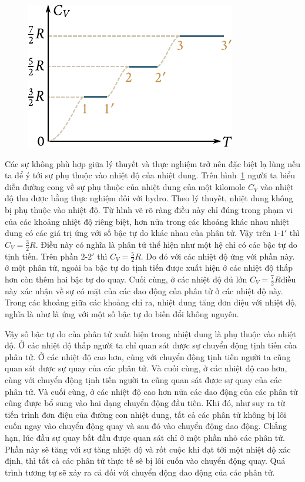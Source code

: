 \begin{figure}[!htb]
	\begin{center}
		\includegraphics[scale=1.0]{figures/ch_11/fig_11_13.pdf}
		\caption[]{}
		\label{fig:11_13}
	\end{center}
	\vspace{-0.8cm}
\end{figure}

Các sự không phù hợp giữa lý thuyết và thực nghiệm trở nên đặc biệt lạ lùng nếu ta để ý tới sự phụ thuộc vào nhiệt độ của nhiệt dung. Trên hình~\ref{fig:11_13} người ta biểu diễn đường cong về sự phụ thuộc của nhiệt dung của một kilomole $C_V$ vào nhiệt độ thu được bằng thực nghiệm đối với hydro. Theo lý thuyết, nhiệt dung không bị phụ thuộc vào nhiệt độ. Từ hình vẽ rõ ràng điều này chỉ đúng trong phạm vi của các khoảng nhiệt độ riêng biệt, hơn nữa trong các khoảng khác nhau nhiệt dung có các giá trị ứng với số bậc tự do khác nhau của phân tử. Vậy trên $1$-$1'$ thì $C_V=\frac{3}{2}R$. Điều này có nghĩa là phân tử thể hiện như một hệ chỉ có các bậc tự do tịnh tiến. Trên phần $2$-$2'$ thì $C_V=\frac{5}{2}R$. Do đó với các nhiệt độ ứng với phần này. ở một phân tử, ngoài ba bậc tự do tịnh tiến được xuất hiện ở các nhiệt độ thấp hơn còn thêm hai bậc tự do quay. Cuối cùng, ở các nhiệt độ đủ lớn $C_V=\frac{7}{2}R$điều này xác nhận về sự có mặt của các dao động của phân tử ở các nhiệt độ này. Trong các khoảng giữa các khoảng chỉ ra, nhiệt dung tăng đơn điệu với nhiệt độ, nghĩa là như là ứng với một số bậc tự do biến đổi không nguyên. 

Vậy số bậc tự do của phân tử xuất hiện trong nhiệt dung là phụ thuộc vào nhiệt độ. Ở các nhiệt độ thấp người ta chỉ quan sát được sự chuyển động tịnh tiến của phân tử. Ở các nhiệt độ cao hơn, cùng với chuyển động tịnh tiến người ta cũng quan sát được sự quay của các phân tử. Và cuối cùng, ở các nhiệt độ cao hơn, cùng với chuyển động tịnh tiến người ta cũng quan sát được sự quay của các phân tử. Và cuối cùng, ở các nhiệt độ cao hơn nữa các dao động của các phân tử cũng được bổ sung vào hai dạng chuyển động đầu tiên. Khi đó, như suy ra từ tiến trình đơn điệu của đường con nhiệt dung, tất cả các phân tử không bị lôi cuốn ngay vào chuyển động quay và sau đó vào chuyển động dao động. Chẳng hạn, lúc đầu sự quay bắt đầu được quan sát chỉ ở một phần nhỏ các phân tử. Phần này sẽ tăng với sự tăng nhiệt độ và rốt cuộc khi đạt tới một nhiệt độ xác định, thì tất cả các phân tử thực tế sẽ bị lôi cuốn vào chuyển động quay. Quá trình tương tự sẽ xảy ra cả đối với chuyển động dao động của các phân tử.

